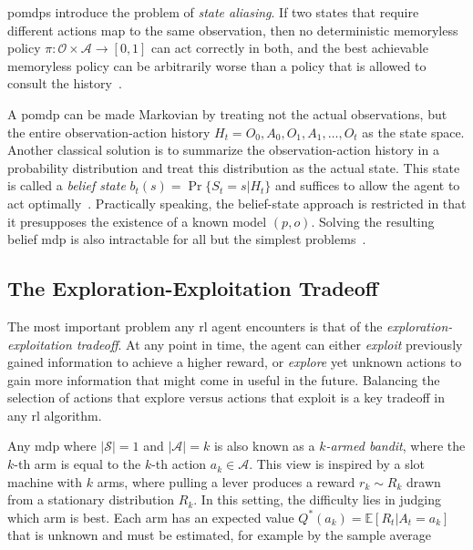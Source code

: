 \glspl{pomdp} introduce the problem of \emph{state aliasing}.
If two states that require different actions map to the same observation, then no deterministic
memoryless policy $\pi:\mathcal{O}\times\mathcal{A}\rightarrow[0,1]$ can act correctly in both,
and the best achievable memoryless policy can be arbitrarily worse than a policy that is
allowed to consult the history~\cite{SINGH1994284}.

A \gls{pomdp} can be made Markovian by treating not the actual observations, but the
entire observation-action history $H_t=O_0,A_0,O_1,A_1,\dots,O_t$ as the state space.
Another classical solution is to summarize the observation-action history in a probability distribution
and treat this distribution as the actual state.
This state is called a \emph{belief state} $b_t(s)=\Pr\{S_t=s|H_t\}$ and suffices
to allow the agent to act optimally~\cite{puterman_markov_2009}.
Practically speaking, the belief-state approach is restricted in that it presupposes
the existence of a known model $(p,o)$. Solving the resulting belief \gls{mdp} is also intractable
for all but the simplest problems~\cite{papadimitriou_complexity_1987}.

\subsection{The Exploration-Exploitation Tradeoff}\label{sec:rl-exploration}

The most important problem any \gls{rl} agent encounters is that of the \emph{exploration-exploitation tradeoff}.
At any point in time, the agent can either \emph{exploit} previously gained information
to achieve a higher reward, or \emph{explore} yet unknown actions to gain more information
that might come in useful in the future.
Balancing the selection of actions that explore versus actions that exploit is a key tradeoff in any \gls{rl} algorithm.

Any \gls{mdp} where $\lvert\mathcal{S}\rvert=1$ and $\lvert\mathcal{A}\rvert=k$ is also known as
a \emph{$k$-armed bandit}, where the $k$-th arm is equal to the $k$-th action $a_k\in\mathcal{A}$.
This view is inspired by a slot machine with $k$ arms, where pulling a lever produces a reward $r_k\sim R_k$
drawn from a stationary distribution $R_k$.
In this setting, the difficulty lies in judging which arm is best.
Each arm has an expected value $Q^*(a_k)=\mathbb{E}[R_t|A_t=a_k]$ that is unknown
and must be estimated, for example by the sample average

